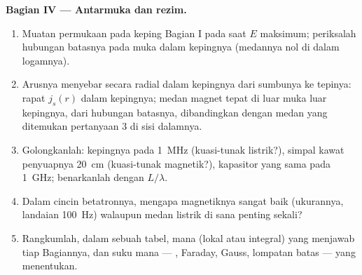 \begin{problem}
\medskip
\noindent\textbf{Bagian IV --- Antarmuka dan rezim.}
\begin{enumerate}[resume]
  \item Muatan permukaan pada keping Bagian I pada saat
        $E$ maksimum; periksalah hubungan batasnya pada muka dalam
        kepingnya (medannya nol di dalam logamnya).
  \item Arusnya menyebar secara radial dalam kepingnya dari sumbunya ke
        tepinya: rapat  $j_s(r)$ dalam kepingnya; medan
        magnet tepat di luar muka luar kepingnya, dari
        hubungan batasnya, dibandingkan dengan medan yang ditemukan pertanyaan 3
        di sisi dalamnya.
  \item Golongkanlah: kepingnya pada \qty{1}{MHz} (kuasi-tunak listrik?), simpal
        kawat penyuapnya \qty{20}{cm} (kuasi-tunak magnetik?), kapasitor yang sama pada
        \qty{1}{GHz}; benarkanlah dengan $L/\lambda$.
  \item Dalam cincin betatronnya, mengapa 
        magnetiknya sangat baik (ukurannya, landaian \qty{100}{Hz}) walaupun
        medan listrik di sana penting sekali?
  \item Rangkumlah, dalam sebuah tabel,  mana (lokal atau
        integral) yang menjawab tiap Bagiannya, dan suku mana --- , Faraday, Gauss, lompatan batas --- yang menentukan.
\end{enumerate}
\end{problem}
